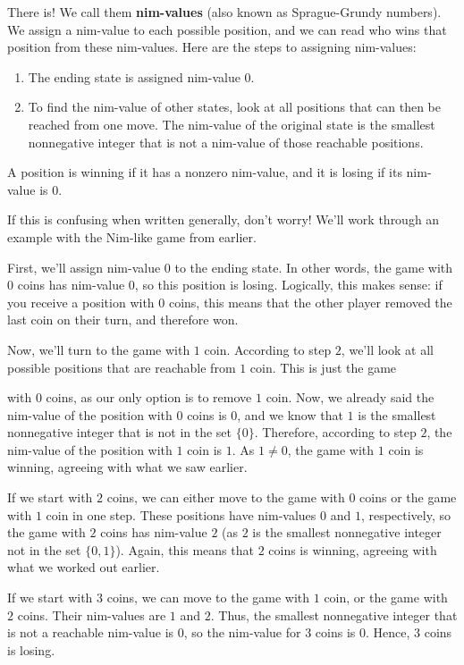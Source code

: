 \documentclass{article}
\begin{document}
There is! We call them \textbf{nim-values} (also known as Sprague-Grundy numbers). We assign a nim-value to each possible position, and we can read who wins that position from these nim-values. Here are the steps to assigning nim-values:

\begin{enumerate}
    \item The ending state is assigned nim-value $0$.
    \item To find the nim-value of other states, look at all positions that can then be reached from one move. The nim-value of the original state is the smallest nonnegative integer that is not a nim-value of those reachable positions.
\end{enumerate}

A position is winning if it has a nonzero nim-value, and it is losing if its nim-value is $0$.

If this is confusing when written generally, don't worry! We'll work through an example with the Nim-like game from earlier.

First, we'll assign nim-value $0$ to the ending state. In other words, the game with $0$ coins has nim-value $0$, so this position is losing. Logically, this makes sense: if you receive a position with $0$ coins, this means that the other player removed the last coin on their turn, and therefore won.

Now, we'll turn to the game with $1$ coin. According to step $2$, we'll look at all possible positions that are reachable from $1$ coin. This is just the game 

with $0$ coins, as our only option is to remove $1$ coin. Now, we already said the nim-value of the position with $0$ coins is $0$, and we know that $1$ is the smallest nonnegative integer that is not in the set $\{0\}$. Therefore, according to step $2$, the nim-value of the position with $1$ coin is $1$. As $1\neq 0$, the game with $1$ coin is winning, agreeing with what we saw earlier.

If we start with $2$ coins, we can either move to the game with $0$ coins or the game with $1$ coin in one step. These positions have nim-values $0$ and $1$, respectively, so the game with $2$ coins has nim-value $2$ (as $2$ is the smallest nonnegative integer not in the set $\{0, 1\}$). Again, this means that $2$ coins is winning, agreeing with what we worked out earlier.

If we start with $3$ coins, we can move to the game with $1$ coin, or the game with $2$ coins. Their nim-values are $1$ and $2$. Thus, the smallest nonnegative integer that is not a reachable nim-value is $0$, so the nim-value for $3$ coins is $0$. Hence, $3$ coins is losing.
\end{document}
